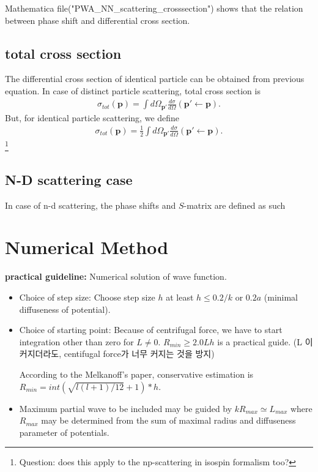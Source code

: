 \documentclass[10pt]{book}
\def\bm{\boldsymbol}
\newcommand{\bea}{\begin{eqnarray}}
\newcommand{\eea}{\end{eqnarray}}
\def\vp{{\bm p}}
\begin{document}
Mathematica file("PWA\_NN\_scattering\_crosssection")
 shows that the relation between phase shift and differential cross section.


\section{total cross section}
The differential cross section of identical particle can be obtained from previous equation.
In case of distinct particle scattering, total cross section is 
\bea 
\sigma_{tot}(\vp)=\int d\Omega_{\vp'} \frac{d\sigma}{d\Omega}(\vp'\leftarrow \vp).
\eea 
But, for identical particle scattering, we define
\bea 
\sigma_{tot}(\vp)=\frac{1}{2}\int d\Omega_{\vp'} \frac{d\sigma}{d\Omega}(\vp'\leftarrow \vp).
\eea 
\footnote{
Question: does this apply to the np-scattering in isospin formalism too? 
}

\section{N-D scattering case}
In case of n-d scattering, the phase shifts and $S$-matrix are defined as such



\newpage
\chapter{Numerical Method}

{\bf practical guideline:} Numerical solution of wave function.
\begin{itemize}
\item Choice of step size: Choose step size $h$ at least 
$h \leq 0.2/k$ or $0.2 a$ (minimal diffuseness of potential). 
\item Choice of starting point: Because of centrifugal force, 
    we have to start 
    integration other than zero for $L\neq 0$. 
    $R_{min}\geq 2.0 L h$ is a practical guide.
    (L 이 커지더라도, centifugal force가 너무 커지는 것을 방지)
    
    According to the Melkanoff's paper,
    conservative estimation is $R_{min}=int(\sqrt{l(l+1)/12}+1)*h$. 
    
    
\item Maximum partial wave to be included may be guided by 
    $k R_{max}\simeq L_{max}$ where $R_{max}$ may be determined
    from the sum of maximal radius and 
    diffuseness parameter  of potentials.      
\end{itemize}
\end{document}
